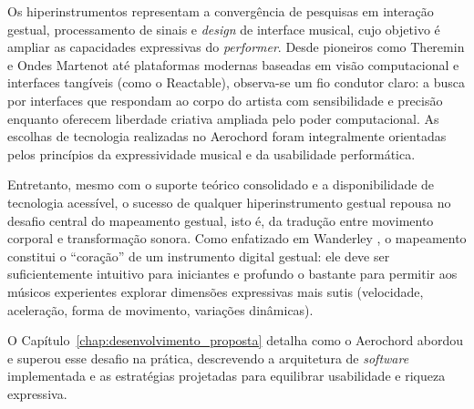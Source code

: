 Os hiperinstrumentos representam a convergência de pesquisas em interação gestual, processamento de sinais e \textit{design} de interface musical, cujo objetivo é ampliar as capacidades expressivas do \textit{performer}. Desde pioneiros como Theremin e Ondes Martenot até plataformas modernas baseadas em visão computacional e interfaces tangíveis (como o Reactable), observa-se um fio condutor claro: a busca por interfaces que respondam ao corpo do artista com sensibilidade e precisão enquanto oferecem liberdade criativa ampliada pelo poder computacional. As escolhas de tecnologia realizadas no Aerochord foram integralmente orientadas pelos princípios da expressividade musical e da usabilidade performática.

Entretanto, mesmo com o suporte teórico consolidado e a disponibilidade de tecnologia acessível, o sucesso de qualquer hiperinstrumento gestual repousa no desafio central do mapeamento gestual, isto é, da tradução entre movimento corporal e transformação sonora. Como enfatizado em Wanderley \citeyear{wanderley2001gestural}, o mapeamento constitui o ``coração'' de um instrumento digital gestual: ele deve ser suficientemente intuitivo para iniciantes e profundo o bastante para permitir aos músicos experientes explorar dimensões expressivas mais sutis (velocidade, aceleração, forma de movimento, variações dinâmicas). 

O Capítulo~\ref{chap:desenvolvimento_proposta} detalha como o Aerochord abordou e superou esse desafio na prática, descrevendo a arquitetura de \textit{software} implementada e as estratégias projetadas para equilibrar usabilidade e riqueza expressiva.
